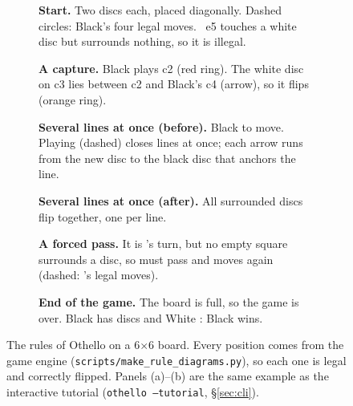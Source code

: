 \documentclass[11pt]{article}
\newcommand{\bx}[1]{#1$\times$#1}
\begin{document}
\begin{figure}[H]
\centering
\begin{subfigure}[t]{0.48\linewidth}\centering
  
  \caption{\textbf{Start.} Two discs each, placed diagonally. Dashed
  circles: Black's four legal moves. \textcolor{red!75!black}{}~e5
  touches a white disc but surrounds nothing, so it is illegal.}
\end{subfigure}\hfill
\begin{subfigure}[t]{0.48\linewidth}\centering
  
  \caption{\textbf{A capture.} Black plays c2 (red ring). The white disc on
  c3 lies between c2 and Black's c4 (arrow), so it flips (orange ring).}
\end{subfigure}

\vspace{4mm}
\begin{subfigure}[t]{0.48\linewidth}\centering
  
  \caption{\textbf{Several lines at once (before).} Black to move. Playing
  \RuleMultiMove{} (dashed) closes \RuleMultiDirs{} lines at once; each arrow
  runs from the new disc to the black disc that anchors the line.}
\end{subfigure}\hfill
\begin{subfigure}[t]{0.48\linewidth}\centering
  
  \caption{\textbf{Several lines at once (after).} All \RuleMultiFlips{}
  surrounded discs flip together, one per line.}
\end{subfigure}

\vspace{4mm}
\begin{subfigure}[t]{0.48\linewidth}\centering
  
  \caption{\textbf{A forced pass.} It is \RulePassMover's turn, but no empty
  square surrounds a \RulePassOther{} disc, so \RulePassMover{} must pass and
  \RulePassOther{} moves again (dashed: \RulePassOther's legal moves).}
\end{subfigure}\hfill
\begin{subfigure}[t]{0.48\linewidth}\centering
  
  \caption{\textbf{End of the game.} The board is full, so the game is over.
  Black has \RuleEndBlack{} discs and White \RuleEndWhite{}: Black wins.}
\end{subfigure}
\caption{The rules of Othello on a \bx{6} board. Every position comes from the
game engine (\texttt{scripts/make\_rule\_diagrams.py}), so each one is legal and
correctly flipped. Panels (a)--(b) are the same example as the interactive
tutorial (\texttt{othello --tutorial}, \S\ref{sec:cli}).}
\label{fig:rules}
\end{figure}
\end{document}
